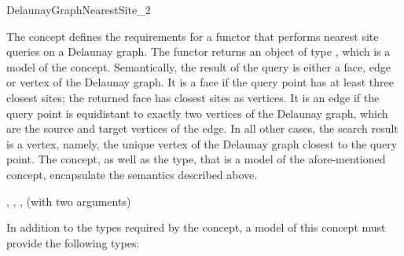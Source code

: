 
\begin{ccRefFunctionObjectConcept}{DelaunayGraphNearestSite_2}

The  concept defines the requirements
for a functor that performs nearest site queries on a Delaunay
graph. The functor returns an object of type , which
is a model of the 
concept. Semantically, the result of the query is either a face, edge or
vertex of the Delaunay graph. It is a face if the query point has at
least three closest sites; the returned face has closest sites as
vertices. It is an edge if the query
point is equidistant to exactly two vertices of the Delaunay graph,
which are the source and target vertices of the edge. In all other
cases, the search result is a vertex, namely, the unique vertex of the
Delaunay graph closest to the query point. The
 concept, as well as the
 type, that is a model of the afore-mentioned concept,
encapsulate the semantics described above.

\ccRefines
{}, , ,
 (with two arguments)

\ccTypes

In addition to the types required by the 
concept, a model of this concept must provide the following types:

\ccGlue
{}
\ccThreeToTwo
\ccGlue
{}


\end{ccRefFunctionObjectConcept}
